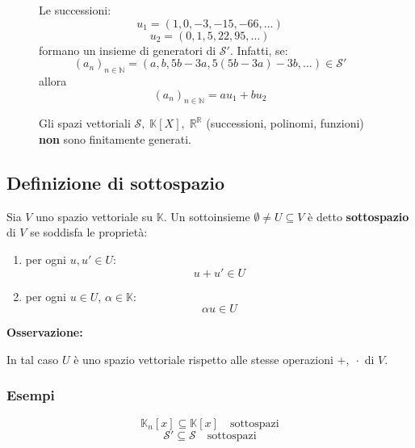 \documentclass[a4paper]{article}
\theoremstyle{break}
\theoremstyle{break}
\theoremstyle{break}
\theoremstyle{break}
\begin{document}
  \begin{figure}[H]
    \begin{example}
      Le successioni:
      \[
      u_1 = (1,0,-3,-15,-66, \ldots)
      \] 
      \[
      u_2 = (0,1,5,22,95, \ldots)
      \] 
      formano un insieme di generatori di \( \mathcal{S}' \). Infatti, se:
      \[
        (a_n)_{n \in \mathbb{N}} = (a,b,5b-3a,5(5b-3a)-3b, \ldots) \in \mathcal{S}'
      \] 
      allora
      \[
        (a_n)_{n \in \mathbb{N}} = au_1 + bu_2
      \] 
    \end{example}
  \end{figure}
  \begin{figure}[H]
    \begin{example}
      Gli spazi vettoriali \( \mathcal{S},\; \mathbb{K}[X],\; \mathbb{R}^\mathbb{R} \) 
      (successioni, polinomi, funzioni) \textbf{non} sono finitamente generati.
    \end{example}
  \end{figure}

  \subsection{Definizione di sottospazio}
  Sia \( V \) uno spazio vettoriale su \( \mathbb{K} \). Un sottoinsieme \( \emptyset \neq U \subseteq V \) 
  è detto \textbf{sottospazio} di \( V \) se soddisfa le proprietà:
  \begin{enumerate}
    \item per ogni \( u,u' \in U \):
      \[
      u + u' \in U
      \] 
    \item per ogni \( u \in U \), \( \alpha \in \mathbb{K} \):
      \[
        \alpha u \in U
      \] 
  \end{enumerate}
  \noindent \textbf{Osservazione:}
  
  \noindent In tal caso \( U \) è uno spazio vettoriale rispetto alle stesse operazioni
  \( +,\; \cdot  \) di \( V \).

  \subsubsection{Esempi}
  \begin{figure}[H]
    \begin{example}
      \[
        \mathbb{K}_n[x] \subseteq \mathbb{K}[x] \quad \text{sottospazi}
      \] 
      \[
        \mathcal{S'} \subseteq \mathcal{S} \quad \text{sottospazi}
      \] 
    \end{example}
  \end{figure}
\end{document}
